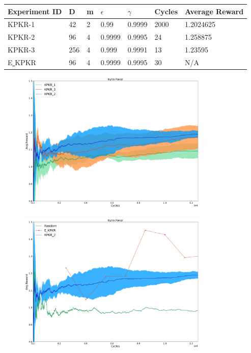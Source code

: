 \documentclass{article}
\theoremstyle{definition}
\newtheorem{primary statistics}[definition]{Primary Statistics}
\newtheorem{auxiliary statistics}[definition]{Auxiliary Statistics}
\begin{document}
\begin{tabular}{|l|l|l|l|l|l|l|}
\hline \centering 
  Experiment ID& D & m & $\epsilon$ & $\gamma$ & Cycles & Average Reward \\ \hline
KPKR-1  & 42        & 2           & 0.99        & 0.9999            & 2000   & 1.2024625        \\ \hline
KPKR-2  & 96        & 4           & 0.9999      & 0.9995            & 24     & 1.258875         \\ \hline
KPKR-3  & 256       & 4           & 0.999       & 0.9991            & 13     & 1.23595         \\ \hline
E\underline{ }KPKR  & 96       & 4           & 0.9999       & 0.9995            & 30     & N/A         \\ \hline
\end{tabular} 


 \begin{figure}[h]
 \centering
    \includegraphics[width=9.1cm]{4_Kuhn_Poker}
\end{figure}

 \begin{figure}[h]
 \centering
    \includegraphics[width=9.1cm]{Kuhn_Poker}
\end{figure}
\end{document}
